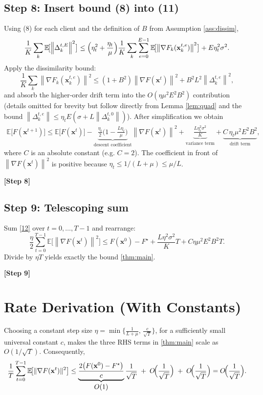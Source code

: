 \documentclass{article}
\newcommand{\E}{\mathbb{E}}
\newcommand{\norm}[1]{\left\lVert #1 \right\rVert}
\begin{document}
\subsection*{Step 8: Insert bound (8) into (11)}
Using (8) for each client and the definition of $B$ from Assumption \ref{ass:dissim},
\[
\frac{1}{K}\sum_{k}\E\!\bigl[\norm{\Delta_{k}^{t,E}}^{2}\bigr]
\le
\Bigl(\eta_t^{2}+\frac{\eta_t}{\mu}\Bigr)
\frac{1}{K}\sum_{k}\sum_{e=0}^{E-1}
\E\!\bigl[\norm{\nabla F_k(\mathbf{x}_{k}^{t,e})}^{2}\bigr]
+E\eta_t^{2}\sigma^{2}.
\]
Apply the dissimilarity bound:
\[
\frac{1}{K}\sum_{k}\norm{\nabla F_k(\mathbf{x}_{k}^{t,e})}^{2}
\le (1+B^{2})\norm{\nabla F(\mathbf{x}^{t})}^{2}
+ B^{2}L^{2}\norm{\Delta_{k}^{t,e}}^{2},
\]
and absorb the higher‑order drift term into the $O(\eta\mu^{2}E^{2}B^{2})$ contribution (details omitted for brevity but follow directly from Lemma \ref{lem:quad} and the bound $\norm{\Delta_{k}^{t,e}}\le \eta_tE(\sigma+L\norm{\Delta_{k}^{t,0}})$). After simplification we obtain
\begin{align}
\E\!\bigl[F(\mathbf{x}^{t+1})\bigr]
\le
\E\!\bigl[F(\mathbf{x}^{t})\bigr]
-\underbrace{\frac{\eta_t}{2}\bigl(1-\tfrac{L\eta_t}{\mu}\bigr)}_{\text{descent coefficient}}
\norm{\nabla F(\mathbf{x}^{t})}^{2}
+\underbrace{\frac{L\eta_t^{2}\sigma^{2}}{K}}_{\text{variance term}}
+\underbrace{C\,\eta_t\mu^{2}E^{2}B^{2}}_{\text{drift term}},
\tag{12}
\end{align}
where $C$ is an absolute constant (e.g. $C=2$). The coefficient in front of $\norm{\nabla F(\mathbf{x}^{t})}^{2}$ is positive because $\eta_t\le 1/(L+\mu)\le \mu/L$.

\noindent\textbf{[Step 8]}

\subsection*{Step 9: Telescoping sum}
Sum \eqref{12} over $t=0,\dots,T-1$ and rearrange:
\[
\frac{\eta}{2}\sum_{t=0}^{T-1}
\E\!\bigl[\norm{\nabla F(\mathbf{x}^{t})}^{2}\bigr]
\le
F(\mathbf{x}^{0})-F^{\star}
+\frac{L\eta^{2}\sigma^{2}}{K}T
+ C\eta\mu^{2}E^{2}B^{2}T.
\]
Divide by $\eta T$ yields exactly the bound \eqref{thm:main}.

\noindent\textbf{[Step 9]}

\section*{Rate Derivation (With Constants)}
Choosing a constant step size $\eta = \min\bigl\{\frac{1}{L+\mu},\,\frac{c}{\sqrt{T}}\bigr\}$, for a sufficiently small universal constant $c$, makes the three RHS terms in \eqref{thm:main} scale as $O(1/\sqrt{T})$. Consequently,
\[
\frac{1}{T}\sum_{t=0}^{T-1}\E\!\bigl[\|\nabla F(\mathbf{x}^{t})\|^{2}\bigr]
\le
\underbrace{\frac{2\bigl(F(\mathbf{x}^{0})-F^{\star}\bigr)}{c}}_{\displaystyle O(1)}
\frac{1}{\sqrt{T}}
\;+\;
O\!\Bigl(\frac{1}{\sqrt{T}}\Bigr)
\;+\;
O\!\Bigl(\frac{1}{\sqrt{T}}\Bigr)
=O\!\Bigl(\frac{1}{\sqrt{T}}\Bigr).
\]
\end{document}
